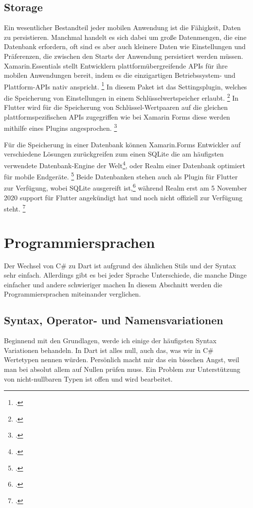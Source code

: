 \subsection{Storage}
Ein wesentlicher Bestandteil jeder mobilen Anwendung ist die Fähigkeit,  Daten zu persistieren.  Manchmal handelt es sich dabei um große Datenmengen,  die eine Datenbank erfordern,  oft sind es aber auch kleinere Daten wie Einstellungen und Präferenzen, die zwischen den Starts der Anwendung persistiert werden müssen.   
Xamarin.Essentials stellt Entwicklern plattformübergreifende APIs für ihre mobilen Anwendungen bereit,  indem es die einzigartigen Betriebssystem- und Plattform-APIs nativ anspricht. \footcite[Vgl.][Abgerufen am \today]{MicrosoftXamEssentials2020} In diesem Paket ist das Settingsplugin, welches die Speicherung von Einstellungen in einem Schlüsselwertspeicher erlaubt.  \footcite[Vgl.][Abgerufen am \today]{MicrosoftXamSettings2019} In Flutter wird für die Speicherung von Schlüssel-Wertpaaren auf die gleichen plattformspezifischen APIs zugegriffen wie bei Xamarin Forms diese werden mithilfe eines Plugins angesprochen.  \footcite[Vgl.][Abgerufen am \today]{GoogleFlutterSharedPreferences2020} 

Für die Speicherung in einer Datenbank können Xamarin.Forms Entwickler auf verschiedene Lösungen zurückgreifen zum einen SQLite  die am häufigsten verwendete Datenbank-Engine der Welt\footcite[Vgl.][Abgerufen am \today]{SQLiteConsortium2020},  oder Realm einer Datenbank optimiert für mobile Endgeräte. \footcite[Vgl.][Abgerufen am \today]{MongoDBRealm2020} Beide Datenbanken stehen auch als Plugin für Flutter zur Verfügung, wobei SQLite ausgereift ist,\footcite[Vgl.][Abgerufen am \today]{Tekartik2020} während Realm erst am 5 November 2020 support für Flutter angekündigt hat und noch nicht offiziell zur Verfügung steht. \footcite[Vgl.][Abgerufen am \today]{MongoDBFlutterSupport2020}


\section{Programmiersprachen}
Der Wechsel von C\# zu Dart ist aufgrund des ähnlichen Stils und der Syntax sehr einfach. Allerdings gibt es bei jeder Sprache Unterschiede, die manche Dinge einfacher und andere schwieriger machen In diesem Abschnitt werden die Programmiersprachen miteinander verglichen.  
\subsection{Syntax, Operator- und Namensvariationen}
Beginnend mit den Grundlagen, werde ich einige der häufigsten Syntax Variationen behandeln.
In Dart ist alles null, auch das, was wir in C\# Wertetypen nennen würden. Persönlich macht mir das ein bisschen Angst, weil man bei absolut allem auf Nullen prüfen muss. Ein Problem zur Unterstützung von nicht-nullbaren Typen ist offen und wird bearbeitet.

